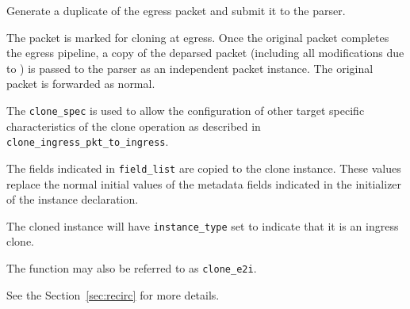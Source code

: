 \documentclass[12pt]{article}
\begin{document}
{ %
Generate a duplicate of the egress packet and submit it to the parser.
}
{ %
}
{ %
The packet is marked for cloning at egress. Once the original packet completes 
the egress pipeline, a copy of the deparsed packet (including all modifications 
due to \matchaction) is passed to the parser as an independent packet instance. 
The original packet is forwarded as normal.

The \texttt{clone_spec} is used to allow the configuration of other target specific 
characteristics of the clone operation as described in \texttt{clone_ingress_pkt_to_ingress}. 


The fields indicated in \texttt{field_list} are copied to the clone instance. These 
values replace the normal initial values of the metadata fields indicated 
in the initializer of the instance declaration. 

The cloned instance will have \texttt{instance_type} set to indicate that it is an 
ingress clone. 

The function may also be referred to as \texttt{clone_e2i}.

See the Section~\ref{sec:recirc} for more details.

}

\end{document}
